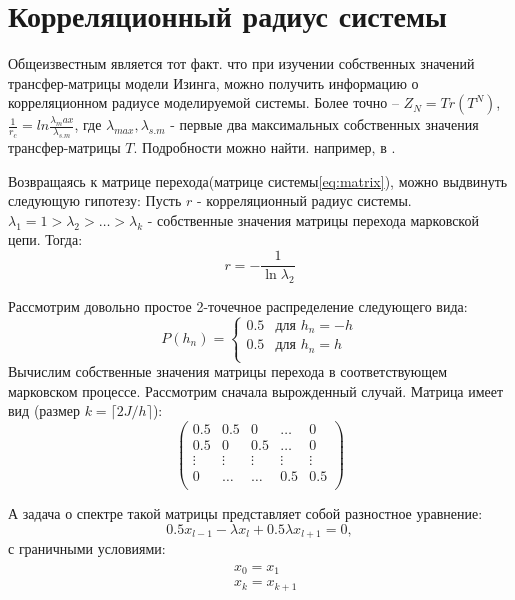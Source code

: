 \section {Корреляционный  радиус системы}

Общеизвестным является тот факт. что при изучении собственных значений трансфер-матрицы модели Изинга, можно получить информацию о корреляционном радиусе моделируемой системы. Более точно -- $Z_N =  Tr(T^N)$, $\frac{1}{r_c} = ln \frac{\lambda_max}{\lambda_{s.m}}$, где $\lambda_{max}, \lambda_{s.m}$ - первые два максимальных собственных значения трансфер-матрицы $T$. Подробности можно найти. например, в \cite{baxter}.

Возвращаясь к матрице перехода(матрице системы\ref{eq:matrix}), можно выдвинуть следующую гипотезу:
	Пусть $r$ - корреляционный радиус системы. $\lambda_1 = 1 > \lambda_2 > \dots >\lambda_k$ - собственные значения матрицы перехода марковской цепи. Тогда:
	\begin{equation}
	r = -\frac{1}{\ln \lambda_2}
	\end{equation}

Рассмотрим довольно простое 2-точечное распределение следующего вида:
\begin{equation}
P(h_n) =
\begin{cases}
0.5 &\mbox{для } h_n= -h \\
0.5 &\mbox{для } h_n= h\\
\end{cases}
\end{equation}
Вычислим собственные значения матрицы перехода в соответствующем марковском процессе. Рассмотрим сначала вырожденный случай. Матрица имеет вид (размер $k=\lceil2J/h \rceil$):
\begin{equation}
\begin{pmatrix}
0.5 & 0.5 & 0 & \dots & 0 \\
0.5 & 0 & 0.5 &\dots & 0\\
\vdots & \vdots & \vdots & \vdots & \vdots\\
0 & \dots & \dots & 0.5 & 0.5\\
\end{pmatrix}
\end{equation} 

А задача о спектре такой матрицы представляет собой разностное уравнение:
\begin{equation}
	0.5 x_{l-1} - \lambda x_{l} + 0.5 \lambda x_{l+1} =0,
\end{equation}
с граничными условиями:
\begin{align}
\begin{split}
	&x_0 = x_1\\
	&x_k = x_{k+1}\\
\end{split}
\end{align}

